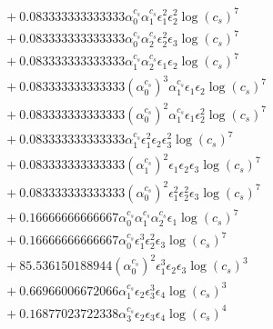 \documentclass[10pt]{article}
\begin{document}
\begin{align*}
&{}  + 0.083333333333333 \alpha_{0}^{c_s} \alpha_{1}^{c_s} \epsilon_{1}^{2} \epsilon_{2}^{2} \log{\left(c_{s} \right)}^{7} \\
&{}  + 0.083333333333333 \alpha_{0}^{c_s} \alpha_{2}^{c_s} \epsilon_{2}^{2} \epsilon_{3} \log{\left(c_{s} \right)}^{7} \\
&{}  + 0.083333333333333 \alpha_{1}^{c_s} \alpha_{2}^{c_s} \epsilon_{1} \epsilon_{2} \log{\left(c_{s} \right)}^{7} \\
&{}  + 0.083333333333333 \left(\alpha_{0}^{c_s}\right)^{3} \alpha_{1}^{c_s} \epsilon_{1} \epsilon_{2} \log{\left(c_{s} \right)}^{7} \\
&{}  + 0.083333333333333 \left(\alpha_{0}^{c_s}\right)^{2} \alpha_{1}^{c_s} \epsilon_{1} \epsilon_{2}^{2} \log{\left(c_{s} \right)}^{7} \\
&{}  + 0.083333333333333 \alpha_{1}^{c_s} \epsilon_{1}^{2} \epsilon_{2} \epsilon_{3}^{2} \log{\left(c_{s} \right)}^{7} \\
&{}  + 0.083333333333333 \left(\alpha_{1}^{c_s}\right)^{2} \epsilon_{1} \epsilon_{2} \epsilon_{3} \log{\left(c_{s} \right)}^{7} \\
&{}  + 0.083333333333333 \left(\alpha_{0}^{c_s}\right)^{2} \epsilon_{1}^{2} \epsilon_{2}^{2} \epsilon_{3} \log{\left(c_{s} \right)}^{7} \\
&{}  + 0.16666666666667 \alpha_{0}^{c_s} \alpha_{1}^{c_s} \alpha_{2}^{c_s} \epsilon_{1} \log{\left(c_{s} \right)}^{7} \\
&{}  + 0.16666666666667 \alpha_{0}^{c_s} \epsilon_{1}^{3} \epsilon_{2}^{2} \epsilon_{3} \log{\left(c_{s} \right)}^{7} \\
&{}  + 85.536150188944 \left(\alpha_{0}^{c_s}\right)^{2} \epsilon_{1}^{3} \epsilon_{2} \epsilon_{3} \log{\left(c_{s} \right)}^{3} \\
&{}  + 0.66966006672066 \alpha_{1}^{c_s} \epsilon_{2} \epsilon_{3}^{3} \epsilon_{4} \log{\left(c_{s} \right)}^{3} \\
&{}  + 0.16877023722338 \alpha_{3}^{c_s} \epsilon_{2} \epsilon_{3} \epsilon_{4} \log{\left(c_{s} \right)}^{4}
\end{align*}
\end{document}
